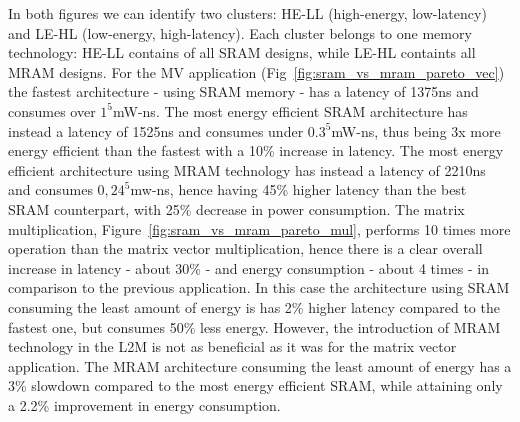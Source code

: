In both figures we can identify two clusters: HE-LL (high-energy, low-latency) and LE-HL (low-energy, high-latency). Each cluster belongs to one memory technology: HE-LL contains of all SRAM designs, while LE-HL containts all MRAM designs.
For the MV application (Fig~\ref{fig:sram_vs_mram_pareto_vec}) the fastest architecture - using SRAM memory - has a latency of 1375ns and consumes over $1^5$mW-ns. The most energy efficient SRAM architecture has instead a latency of 1525ns and consumes under $0.3^5$mW-ns, thus being 3x more energy efficient than the fastest with a 10\% increase in latency. The most energy efficient architecture using MRAM technology has instead a latency of 2210ns and consumes $0,24^5$mw-ns, hence having 45\% higher latency than the best SRAM counterpart, with 25\% decrease in power consumption. The matrix multiplication, Figure~\ref{fig:sram_vs_mram_pareto_mul}, performs 10 times more operation than the matrix vector multiplication, hence there is a clear overall increase in latency - about 30\% - and energy consumption - about 4 times -  in comparison to the previous application. In this case the architecture using SRAM consuming the least amount of energy is has 2\% higher latency compared to the fastest one, but consumes 50\% less energy. However, the introduction of MRAM technology in the L2M is not as beneficial as it was for the matrix vector application. The MRAM architecture consuming the least amount of energy has a 3\% slowdown compared to the most energy efficient SRAM, while attaining only a 2.2\% improvement in energy consumption.

\begin{table}[!ht]
\caption{Comparison with related work.}
\label{tab:rw}
\end{table}

